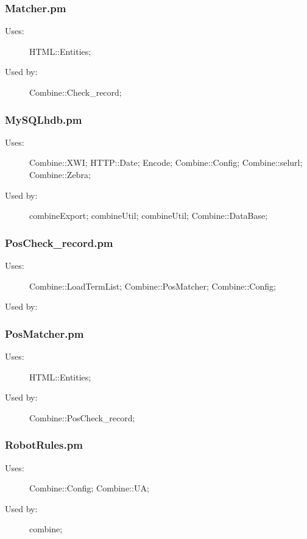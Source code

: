 \subsubsection{Matcher.pm}
\begin{description}
\item[Uses:] HTML::Entities; 

\item[Used by:] Combine::Check\_record; 

\end{description}
\subsubsection{MySQLhdb.pm}
\begin{description}
\item[Uses:] Combine::XWI; HTTP::Date; Encode; Combine::Config; Combine::selurl; Combine::Zebra; 

\item[Used by:] combineExport; combineUtil; combineUtil; Combine::DataBase; 

\end{description}
\subsubsection{PosCheck\_record.pm}
\begin{description}
\item[Uses:] Combine::LoadTermList; Combine::PosMatcher; Combine::Config; 

\item[Used by:] 

\end{description}
\subsubsection{PosMatcher.pm}
\begin{description}
\item[Uses:] HTML::Entities; 

\item[Used by:] Combine::PosCheck\_record; 

\end{description}
\subsubsection{RobotRules.pm}
\begin{description}
\item[Uses:] Combine::Config; Combine::UA; 

\item[Used by:] combine; 

\end{description}
